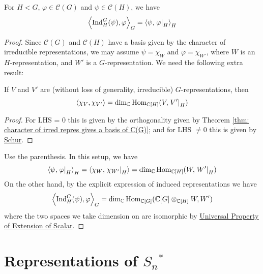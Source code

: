 \documentclass{article}
\begin{document}
\begin{theorem}
    For $H < G$, $\varphi \in \mathcal{C}(G)$ and $\psi \in \mathcal{C}(H)$, we have
    \[
        \left\langle \mathrm{Ind}_H^G(\psi), \varphi \right\rangle_G = \left\langle \psi, \left.\varphi\right|_{H} \right\rangle_H
    \]
\end{theorem}

\begin{proof}
    Since $\mathcal{C}(G)$ and $\mathcal{C}(H)$ have a basis given by the character of irreducible representations, we may assume $\psi = \chi_W$ and $\varphi = \chi_{W'}$, where $W$ is an $H$-representation, and $W'$ is a $G$-representation. We need the following extra result:

    \begin{parenthesis}
        If $V$ and $V'$ are (without loss of generality, irreducible) $G$-representations, then
        \[
            \left\langle \chi_V, \chi_{V'} \right\rangle = \dim_{\mathbb{C}} \mathrm{Hom}_{\mathbb{C}[H]} (V, \left.V'\right|_{H})
        \]
    \end{parenthesis}

    \begin{proof}
        For LHS = 0 this is given by the orthogonality given by Theorem \ref{thm: character of irred repres gives a basis of C(G)}; and for LHS $\neq 0$ this is given by \hyperref[lem: Schur]{Schur}.
    \end{proof}

    Use the parenthesis. In this setup, we have
    \[
        \left\langle \psi, \left.\varphi\right|_{H} \right\rangle_H = \left\langle \chi_{W}, \left.\chi_{W'}\right|_{H} \right\rangle = \dim_{\mathbb{C}} \mathrm{Hom}_{\mathbb{C}[H]} (W, \left.W'\right|_{H})
    \]
    On the other hand, by the explicit expression of induced representations we have
    \[
        \left\langle \mathrm{Ind}_H^G(\psi), \varphi \right\rangle_G = \dim_{\mathbb{C}} \mathrm{Hom}_{\mathbb{C}[G]} (\mathbb{C}[G] \otimes_{\mathbb{C}[H]} W, W')
    \]
    where the two spaces we take dimension on are isomorphic by \hyperref[prop: Universal Property of Extension of Scalar]{Universal Property of Extension of Scalar}.
\end{proof}

\section{Representations of $S_n$$^{\ast}$}
\end{document}
